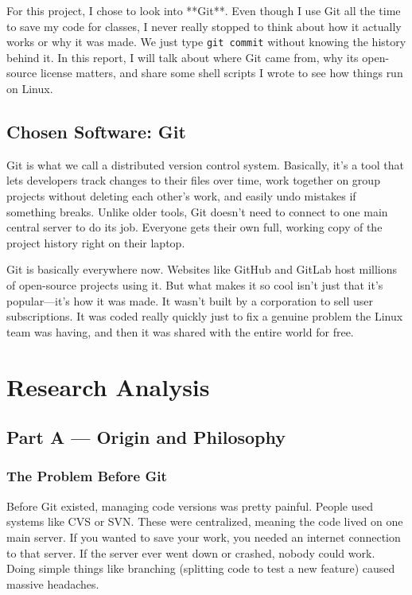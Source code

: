 \documentclass[12pt,a4paper]{report}
\begin{document}
For this project, I chose to look into **Git**. Even though I use Git all the time to save my code for classes, I never really stopped to think about how it actually works or why it was made. We just type \texttt{git commit} without knowing the history behind it. In this report, I will talk about where Git came from, why its open-source license matters, and share some shell scripts I wrote to see how things run on Linux.

\section{Chosen Software: Git}

Git is what we call a distributed version control system. Basically, it's a tool that lets developers track changes to their files over time, work together on group projects without deleting each other's work, and easily undo mistakes if something breaks. Unlike older tools, Git doesn't need to connect to one main central server to do its job. Everyone gets their own full, working copy of the project history right on their laptop. 

Git is basically everywhere now. Websites like GitHub and GitLab host millions of open-source projects using it. But what makes it so cool isn't just that it's popular---it's how it was made. It wasn't built by a corporation to sell user subscriptions. It was coded really quickly just to fix a genuine problem the Linux team was having, and then it was shared with the entire world for free.

\chapter{Research Analysis}

\section{Part A --- Origin and Philosophy}

\subsection{The Problem Before Git}
Before Git existed, managing code versions was pretty painful. People used systems like CVS or SVN. These were centralized, meaning the code lived on one main server. If you wanted to save your work, you needed an internet connection to that server. If the server ever went down or crashed, nobody could work. Doing simple things like branching (splitting code to test a new feature) caused massive headaches.
\end{document}
